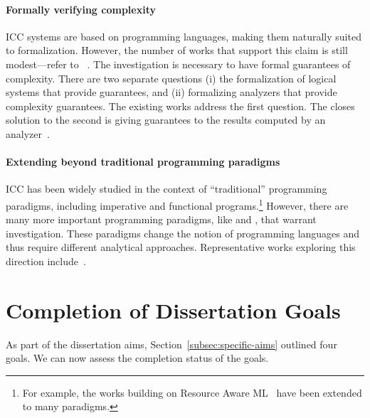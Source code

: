 \paragraph*{Formally verifying complexity}
ICC systems are based on programming languages, making them naturally suited
to formalization. However, the number of works that support this claim is
still modest---refer to \eg~\cite{feree2018,heraud2011,atkey2024}. The
investigation is necessary to have formal guarantees of complexity. There
are two separate questions (i) the formalization of logical systems that
provide guarantees, and (ii) formalizing analyzers that provide complexity
guarantees. The existing works address the first question. The closes
solution to the second is giving guarantees to the results computed by an
analyzer~\cite{carbonneaux2017}.

\paragraph*{Extending beyond traditional programming paradigms}
ICC has been widely studied in the context of \enquote{traditional} programming
paradigms, including imperative and functional programs.\footnote{ For example,
the works building on Resource Aware ML~\cite{hoffmann2012} have
been extended to many paradigms.} However, there are many more important
programming paradigms, like  and , that warrant investigation. These paradigms change the notion of
programming languages and thus require different analytical approaches.
Representative works exploring this direction
include~\cite{dallago2010,avanzini2024,colledan2024,avanzini2020}.

\section{Completion of Dissertation Goals}
\label{sec:res-summary}

As part of the dissertation aims, Section~\autoref{subsec:specific-aims} outlined
four goals. We can now assess the completion status of the goals.

